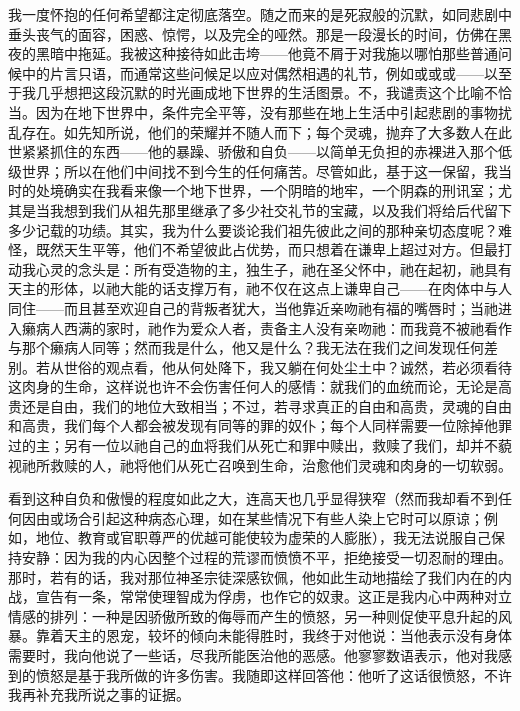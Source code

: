 我一度怀抱的任何希望都注定彻底落空。随之而来的是死寂般的沉默，如同悲剧中垂头丧气的面容，困惑、惊愕，以及完全的哑然。那是一段漫长的时间，仿佛在黑夜的黑暗中拖延。我被这种接待如此击垮——他竟不屑于对我施以哪怕那些普通问候中的片言只语，而通常这些问候足以应对偶然相遇的礼节，例如或或或——以至于我几乎想把这段沉默的时光画成地下世界的生活图景。不，我谴责这个比喻不恰当。因为在地下世界中，条件完全平等，没有那些在地上生活中引起悲剧的事物扰乱存在。如先知所说，他们的荣耀并不随人而下；每个灵魂，抛弃了大多数人在此世紧紧抓住的东西——他的暴躁、骄傲和自负——以简单无负担的赤裸进入那个低级世界；所以在他们中间找不到今生的任何痛苦。尽管如此，基于这一保留，我当时的处境确实在我看来像一个地下世界，一个阴暗的地牢，一个阴森的刑讯室；尤其是当我想到我们从祖先那里继承了多少社交礼节的宝藏，以及我们将给后代留下多少记载的功绩。其实，我为什么要谈论我们祖先彼此之间的那种亲切态度呢？难怪，既然天生平等，他们不希望彼此占优势，而只想着在谦卑上超过对方。但最打动我心灵的念头是：所有受造物的主，独生子，祂在圣父怀中，祂在起初，祂具有天主的形体，以祂大能的话支撑万有，祂不仅在这点上谦卑自己——在肉体中与人同住——而且甚至欢迎自己的背叛者犹大，当他靠近亲吻祂有福的嘴唇时；当祂进入癞病人西满的家时，祂作为爱众人者，责备主人没有亲吻祂：而我竟不被祂看作与那个癞病人同等；然而我是什么，他又是什么？我无法在我们之间发现任何差别。若从世俗的观点看，他从何处降下，我又躺在何处尘土中？诚然，若必须看待这肉身的生命，这样说也许不会伤害任何人的感情：就我们的血统而论，无论是高贵还是自由，我们的地位大致相当；不过，若寻求真正的自由和高贵，灵魂的自由和高贵，我们每个人都会被发现有同等的罪的奴仆；每个人同样需要一位除掉他罪过的主；另有一位以祂自己的血将我们从死亡和罪中赎出，救赎了我们，却并不藐视祂所救赎的人，祂将他们从死亡召唤到生命，治愈他们灵魂和肉身的一切软弱。\par

看到这种自负和傲慢的程度如此之大，连高天也几乎显得狭窄（然而我却看不到任何因由或场合引起这种病态心理，如在某些情况下有些人染上它时可以原谅；例如，地位、教育或官职尊严的优越可能使较为虚荣的人膨胀），我无法说服自己保持安静：因为我的内心因整个过程的荒谬而愤愤不平，拒绝接受一切忍耐的理由。那时，若有的话，我对那位神圣宗徒深感钦佩，他如此生动地描绘了我们内在的内战，宣告有一条，常常使理智成为俘虏，也作它的奴隶。这正是我内心中两种对立情感的排列：一种是因骄傲所致的侮辱而产生的愤怒，另一种则促使平息升起的风暴。靠着天主的恩宠，较坏的倾向未能得胜时，我终于对他说：当他表示没有身体需要时，我向他说了一些话，尽我所能医治他的恶感。他寥寥数语表示，他对我感到的愤怒是基于我所做的许多伤害。我随即这样回答他：他听了这话很愤怒，不许我再补充我所说之事的证据。\par

